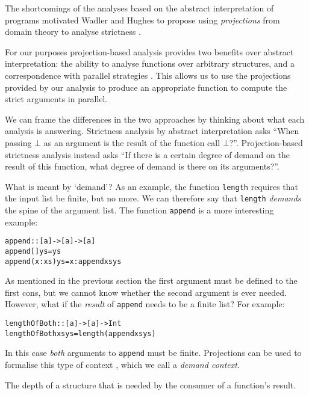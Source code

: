 The shortcomings of the analyses based on the abstract interpretation of
programs motivated Wadler and Hughes to propose using \emph{projections} from
domain theory to analyse strictness \citep{wadler1987projections}.

For our purposes projection-based analysis provides two benefits over abstract
interpretation: the ability to analyse functions over arbitrary structures, and
a correspondence with parallel strategies \citep{marlow2010seq, strategies}.
This allows us to use the projections provided by our analysis to produce an
appropriate function to compute the strict arguments in parallel.

We can frame the differences in the two approaches by thinking about what each
analysis is answering. Strictness analysis by abstract interpretation asks
``When passing $\bot$ as an argument is the result of the function call
$\bot$?''. Projection-based strictness analysis instead asks ``If there is a
certain degree of demand on the result of this function, what degree of demand
is there on its arguments?''.

What is meant by `demand'? As an example, the function \verb'length' requires
that the input list be finite, but no more. We can therefore say that
\verb'length' \emph{demands} the spine of the argument list. The function
\verb'append' is a more interesting example:

\begin{alltt}
        append :: [a] -> [a] -> [a]
        append []     ys = ys
        append (x:xs) ys = x : append xs ys
\end{alltt}

As mentioned in the previous section the first argument must be defined to the
first cons, but we cannot know whether the second argument is ever needed.
However, what if the \emph{result} of \verb'append' needs to be a finite list?
For example:

\begin{alltt}
    lengthOfBoth :: [a] -> [a] -> Int
    lengthOfBoth xs ys = length (append xs ys)
\end{alltt}

In this case \emph{both} arguments to \verb'append' must be finite. Projections
can be used to formalise this type of context \citep{wadler1987projections,
hinze1995projection}, which we call a \emph{demand context}.

           {The depth of a structure that is needed by the consumer of a
            function's result.}

